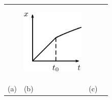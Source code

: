 \begin{enumerate}[noitemsep, label=\textbf{\arabic*}. ]
\begin{center}
\begin{xtabular*}{\mytablewidth}[t]{|p{10\mystarwidth}|p{10\mystarwidth}|p{10\mystarwidth}|p{10\mystarwidth}|}
    \addtocounter{footnote}{-0}
     &
    
    
        
    \setcounter{subfigure}{0}

\label{m38796*id81684}
    \begin{center}
    \label{m38796*id81684!!!underscore!!!media}\label{m38796*id81684!!!underscore!!!printimage}\includegraphics[width=3cm]{col11305.imgs/m38796_PG10C2_050.png} %
        
      \vspace{2pt}
    \vspace{.1in}
    
    \end{center}



    \addtocounter{footnote}{-0}
     \tabularnewline{}
    
    
        (a) &
    
    
        (b) &
    
    
        (c) &
    
    

\end{xtabular*}
\end{center}
\end{enumerate}
